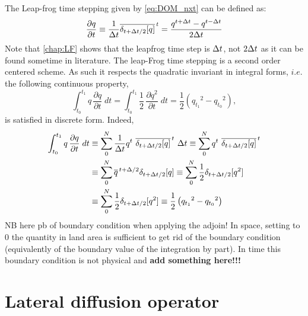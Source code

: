 \documentclass[../tex_main/NEMO_manual]{subfiles}
\begin{document}
The Leap-frog time stepping given by \autoref{eq:DOM_nxt} can be defined as:
\begin{equation} \label{eq:LF}
   \frac{\partial q}{\partial t} 
   		\equiv \frac{1}{\Delta t} \overline{ \delta _{t+\Delta t/2}[q]}^{\,t} 
		=         \frac{q^{t+\Delta t}-q^{t-\Delta t}}{2\Delta t}
\end{equation} 
Note that \autoref{chap:LF} shows that the leapfrog time step is $\Delta t$, not $2\Delta t$ 
as it can be found sometime in literature. 
The leap-Frog time stepping is a second order centered scheme. As such it respects 
the quadratic invariant in integral forms, $i.e.$ the following continuous property,
\begin{equation} \label{eq:Energy}
\int_{t_0}^{t_1} {q\, \frac{\partial q}{\partial t} \;dt} 
	=\int_{t_0}^{t_1} {\frac{1}{2}\, \frac{\partial q^2}{\partial t} \;dt} 
	=  \frac{1}{2} \left( {q_{t_1}}^2 - {q_{t_0}}^2 \right) ,
\end{equation}
is satisfied in discrete form. Indeed, 
\begin{equation} \begin{split}
\int_{t_0}^{t_1} {q\, \frac{\partial q}{\partial t} \;dt} 
	&\equiv \sum\limits_{0}^{N} 
			{\frac{1}{\Delta t} q^t \ \overline{ \delta _{t+\Delta t/2}[q]}^{\,t} \ \Delta t} 
	   \equiv \sum\limits_{0}^{N}  { q^t \ \overline{ \delta _{t+\Delta t/2}[q]}^{\,t} } \\
	&\equiv \sum\limits_{0}^{N}  { \overline{q}^{\,t+\Delta/2}{ \delta _{t+\Delta t/2}[q]}}
	   \equiv \sum\limits_{0}^{N}  { \frac{1}{2} \delta _{t+\Delta t/2}[q^2] }\\
	&\equiv \sum\limits_{0}^{N}  { \frac{1}{2} \delta _{t+\Delta t/2}[q^2] }
	   \equiv \frac{1}{2} \left( {q_{t_1}}^2 - {q_{t_0}}^2 \right)
\end{split} \end{equation}
NB here pb of boundary condition when applying the adjoin! In space, setting to 0 
the quantity in land area is sufficient to get rid of the boundary condition 
(equivalently of the boundary value of the integration by part). In time this boundary 
condition is not physical and \textbf{add something here!!!}







\section{Lateral diffusion operator}
\end{document}
